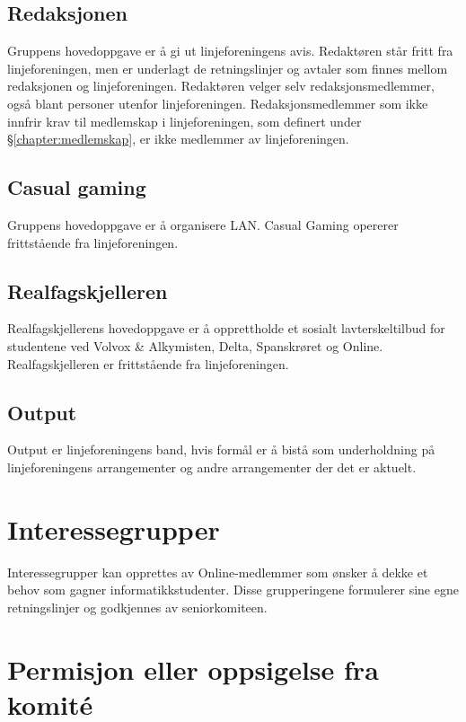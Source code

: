 \subsection{Redaksjonen}{
Gruppens hovedoppgave er å gi ut linjeforeningens avis. Redaktøren står fritt fra linjeforeningen, men er underlagt de retningslinjer og avtaler som finnes mellom redaksjonen og linjeforeningen. Redaktøren velger selv redaksjonsmedlemmer, også blant personer utenfor linjeforeningen. Redaksjonsmedlemmer som ikke innfrir krav til medlemskap i linjeforeningen, som definert under §\ref{chapter:medlemskap}, er ikke medlemmer av linjeforeningen.
}

\subsection{Casual gaming}{
Gruppens hovedoppgave er å organisere LAN. Casual Gaming opererer frittstående fra linjeforeningen.
}

\subsection{Realfagskjelleren}{
Realfagskjellerens hovedoppgave er å opprettholde et sosialt lavterskeltilbud for studentene ved Volvox \& Alkymisten, Delta, Spanskrøret og Online. Realfagskjelleren er frittstående fra linjeforeningen.
}

\subsection{Output}{
Output er linjeforeningens band, hvis formål er å bistå som underholdning på linjeforeningens arrangementer og andre arrangementer der det er aktuelt.
}

\section{Interessegrupper}
\vspace{23pt}
Interessegrupper kan opprettes av Online-medlemmer som ønsker å dekke et behov som gagner informatikkstudenter. Disse grupperingene formulerer sine egne retningslinjer og godkjennes av seniorkomiteen.

\section{Permisjon eller oppsigelse fra komité}
\vspace{23pt}

